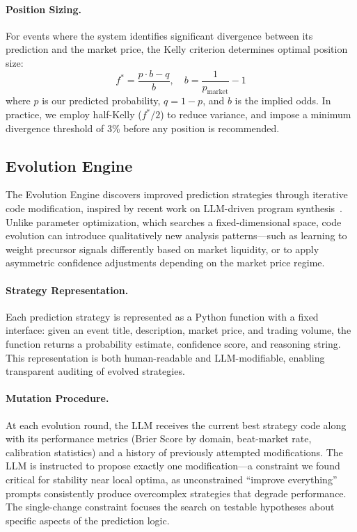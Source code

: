 \paragraph{Position Sizing.} For events where the system identifies significant divergence between its prediction and the market price, the Kelly criterion determines optimal position size:
\begin{equation}
    f^* = \frac{p \cdot b - q}{b}, \quad b = \frac{1}{p_{\text{market}}} - 1
\end{equation}
where $p$ is our predicted probability, $q = 1 - p$, and $b$ is the implied odds. In practice, we employ half-Kelly ($f^*/2$) to reduce variance, and impose a minimum divergence threshold of 3\% before any position is recommended.

\subsection{Evolution Engine}
\label{sec:evolution}

The Evolution Engine discovers improved prediction strategies through iterative code modification, inspired by recent work on LLM-driven program synthesis~\cite{romera2024mathematical}. Unlike parameter optimization, which searches a fixed-dimensional space, code evolution can introduce qualitatively new analysis patterns---such as learning to weight precursor signals differently based on market liquidity, or to apply asymmetric confidence adjustments depending on the market price regime.

\paragraph{Strategy Representation.} Each prediction strategy is represented as a Python function with a fixed interface: given an event title, description, market price, and trading volume, the function returns a probability estimate, confidence score, and reasoning string. This representation is both human-readable and LLM-modifiable, enabling transparent auditing of evolved strategies.

\paragraph{Mutation Procedure.} At each evolution round, the LLM receives the current best strategy code along with its performance metrics (Brier Score by domain, beat-market rate, calibration statistics) and a history of previously attempted modifications. The LLM is instructed to propose exactly one modification---a constraint we found critical for stability near local optima, as unconstrained ``improve everything'' prompts consistently produce overcomplex strategies that degrade performance. The single-change constraint focuses the search on testable hypotheses about specific aspects of the prediction logic.

